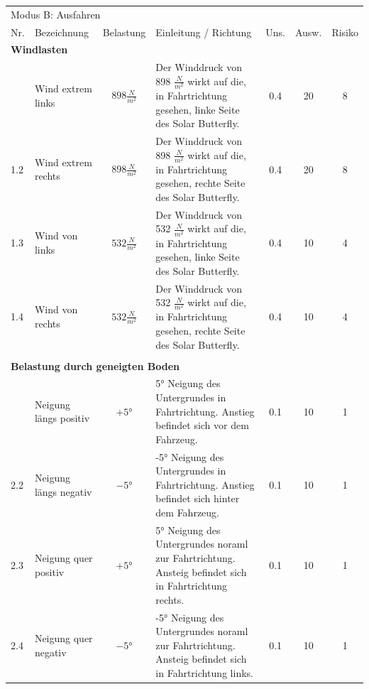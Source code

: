 \begin{landscape}%
  \centering %
  \begin{tabularx}{\linewidth}{llcXccc}
    \multicolumn{7}{l}{\LARGE{Modus B: Ausfahren}}\\
    \thickhline
    Nr. & Bezeichnung & Belastung & Einleitung / Richtung & Uns. & Ausw. & Risiko\\
    \hline
    \multicolumn{7}{l}{\textbf{Windlasten}}\\
    \thickhline
    1.1 & Wind extrem links   & $898 \frac{N}{m^2}$ & Der Winddruck von 898 $\frac{N}{m^2}$ wirkt auf die, in Fahrtrichtung gesehen, linke Seite des Solar Butterfly. %
    & 0.4 & 20 & 8\\
    1.2 & Wind extrem rechts  & $898 \frac{N}{m^2}$ & Der Winddruck von 898 $\frac{N}{m^2}$ wirkt auf die, in Fahrtrichtung gesehen, rechte Seite des Solar Butterfly. %
    & 0.4 & 20 & 8\\
    1.3 & Wind von links      & $532 \frac{N}{m^2}$ & Der Winddruck von 532 $\frac{N}{m^2}$ wirkt auf die, in Fahrtrichtung gesehen, linke Seite des Solar Butterfly. %
    & 0.4 & 10 & 4\\
    1.4 & Wind von rechts     & $532 \frac{N}{m^2}$ & Der Winddruck von 532 $\frac{N}{m^2}$ wirkt auf die, in Fahrtrichtung gesehen, rechte Seite des Solar Butterfly. %
    & 0.4 & 10 & 4\\
    \\[\lineHeightTable]

    \multicolumn{7}{l}{\textbf{Belastung durch geneigten Boden}}\\
    \thickhline
    2.1	& Neigung längs positiv & $+5$° & 5° Neigung des Untergrundes in Fahrtrichtung. Anstieg befindet sich vor dem Fahrzeug. & 0.1 & 10 & 1\\
    2.2	& Neigung längs negativ & $-5$° & -5° Neigung des Untergrundes in Fahrtrichtung. Anstieg befindet sich hinter dem Fahrzeug. & 0.1 & 10 & 1\\
    2.3	& Neigung quer positiv  & $+5$° & 5° Neigung des Untergrundes noraml zur Fahrtrichtung. Ansteig befindet sich in Fahrtrichtung rechts. & 0.1 & 10 & 1\\
    2.4	& Neigung quer negativ  & $-5$° & -5° Neigung des Untergrundes noraml zur Fahrtrichtung. Ansteig befindet sich in Fahrtrichtung links. & 0.1 & 10 & 1\\


\end{tabularx}
\end{landscape}
